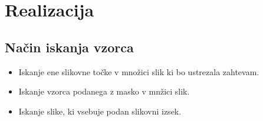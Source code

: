\section{Realizacija}

\subsection{Način iskanja vzorca}
\begin{itemize}
\item Iskanje ene slikovne točke v množici slik ki bo ustrezala zahtevam.
\item Iskanje vzorca podanega z masko v mnžici slik.
\item Iskanje slike, ki vsebuje podan slikovni izsek.
\end{itemize}

